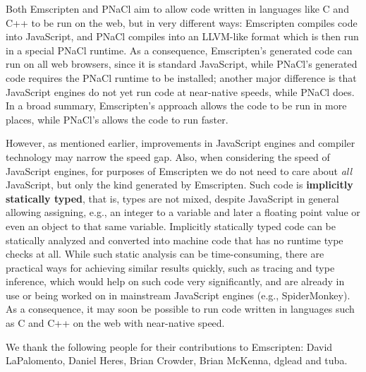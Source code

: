 \documentclass[preprint,10pt]{sigplanconf}
\begin{document}
Both Emscripten
and PNaCl aim to allow code written in languages like C and C++ to
be run on the web, but in very different ways: Emscripten compiles code into JavaScript, and
PNaCl compiles into an LLVM-like format which is then
run in a special PNaCl runtime. As a consequence, Emscripten's generated code can run on all web browsers,
since it is standard JavaScript, while PNaCl's generated code
requires the PNaCl runtime to be installed; another major
difference is that JavaScript engines do not yet run code at
near-native speeds, while PNaCl does. In a broad summary, Emscripten's
approach allows the code to be run in more places, while PNaCl's
allows the code to run faster.

However, as mentioned earlier, improvements in JavaScript engines and compiler
technology may narrow the speed
gap. Also, when considering the speed of JavaScript engines, for purposes of Emscripten we do not need to
care about \emph{all} JavaScript, but only the kind generated by
Emscripten. Such code is \textbf{implicitly statically typed}, that is,
types are not mixed, despite JavaScript in general allowing assigning, e.g., an
integer to a variable and later a floating point value or even an object to that same variable. Implicitly statically
typed code can be statically analyzed and converted into
machine code that has no runtime type checks at all. While such
static analysis can be time-consuming, there are practical ways for
achieving similar results quickly, such as tracing and type inference, which
would help on such code very significantly, and are already in use
or being worked on in mainstream JavaScript engines (e.g., SpiderMonkey). As
a consequence, it may soon be possible to run code written in languages such as
C and C++ on the web with near-native speed.


\acks

We thank the following people for their contributions to Emscripten: David LaPalomento, Daniel Heres, Brian Crowder, Brian McKenna, dglead and tuba.



\end{document}
